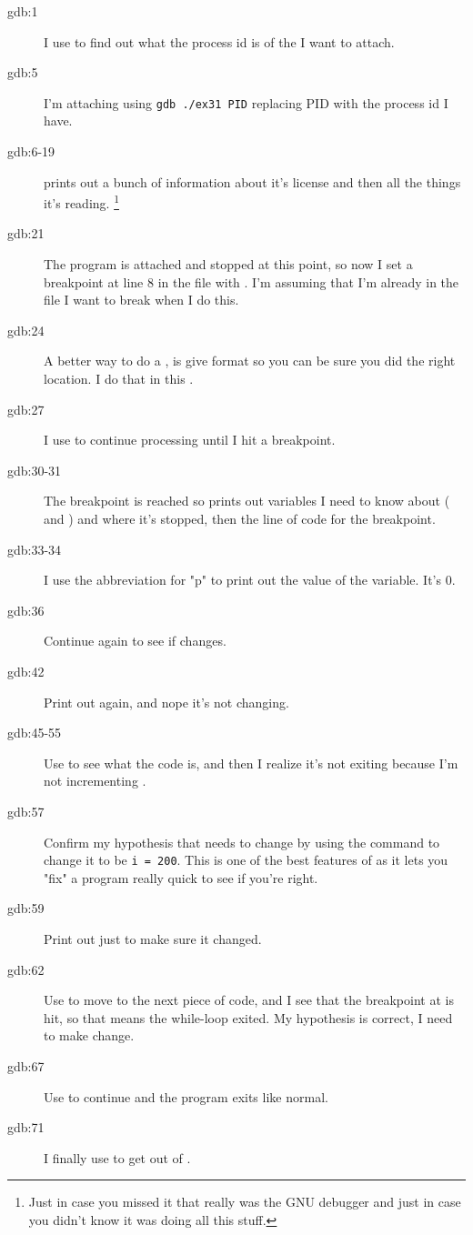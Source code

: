 \begin{enumerate}
\begin{description}
\item[gdb:1] I use  to find out what the process id is
    of the  I want to attach.
\item[gdb:5] I'm attaching using \verb|gdb ./ex31 PID| replacing PID with
    the process id I have.
\item[gdb:6-19]  prints out a bunch of information about it's
    license and then all the things it's reading. \footnote{Just in case you missed
    it that  really was the GNU debugger and just in case
    you didn't know it was doing all this stuff.}
\item[gdb:21] The program is attached and stopped at this point, so now I set
    a breakpoint at line 8 in the file with .
    I'm assuming that I'm already in the file I want to break when I do this.
\item[gdb:24] A better way to do a , is give  format
    so you can be sure you did the right location.  I do that in this .
\item[gdb:27] I use  to continue processing until I hit a breakpoint.
\item[gdb:30-31] The breakpoint is reached so  prints out variables
    I need to know about ( and ) and where it's stopped,
    then the line of code for the breakpoint.
\item[gdb:33-34] I use the abbreviation for  "p" to print out the value
    of the  variable.  It's 0.
\item[gdb:36] Continue again to see if  changes.
\item[gdb:42] Print out  again, and nope it's not changing.
\item[gdb:45-55] Use  to see what the code is, and then I realize
    it's not exiting because I'm not incrementing .
\item[gdb:57] Confirm my hypothesis that  needs to change by using the
     command to change it to be \verb|i = 200|.  This is one of the
    best features of  as it lets you "fix" a program really quick
    to see if you're right.
\item[gdb:59] Print out  just to make sure it changed.
\item[gdb:62] Use  to move to the next piece of code, and I see that
    the breakpoint at  is hit, so that means the while-loop
    exited.  My hypothesis is correct, I need to make  change.
\item[gdb:67] Use  to continue and the program exits like normal.
\item[gdb:71] I finally use  to get out of .
\end{description}


\end{enumerate}
